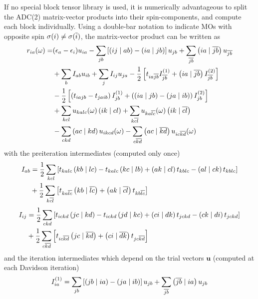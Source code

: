 If no special block tensor library is used, it is numerically advantageous to split the ADC(2) matrix-vector products into their spin-components, and compute each block individually. Using a double-bar notation to indicate MOs with opposite spin $\sigma(i) \neq \sigma(\overline{i})$, the matrix-vector product can be written as
\begin{equation}
\begin{split}
r_{ia}( \omega) = &(\epsilon_a - \epsilon_i) u_{ia} - \sum_{jb} \left[ \left( ij \mid ab \right) - \left( ia \mid jb \right) \right] u_{jb} + \sum_{\overline{jb}} \left( ia \mid \overline{jb} \right) u_{\overline{jb}} \\
&+ \sum_b I_{ab} u_{ib} + \sum_{j} I_{ij} u_{ja} - \frac{1}{2} \left[ t_{ia\overline{jb}} I^{(1)}_{\overline{jb}} + \left( ia \mid \overline{jb} \right) I_{\overline{jb}}^{(2)} \right] \\
&- \frac{1}{2} \left[ \left( t_{iajb} - t_{jaib} \right) I^{(1)}_{jb} + \left(\left( ia \mid jb \right) - \left( ja \mid ib \right) \right) I_{jb}^{(2)} \right] \\
&+ \sum_{kcl} u_{kalc}(\omega) \left( ik \mid cl \right) + \sum_{k\overline{cl}} u_{ka\overline{lc}}(\omega) \left( ik \mid \overline{cl} \right) \\
&- \sum_{ckd} \left( ac \mid kd \right) u_{ikcd}(\omega) - \sum_{c\overline{kd}} \left( ac \mid \overline{kd} \right) u_{ic\overline{kd}}(\omega)
\end{split}
\end{equation}  
\noindent with the preiteration intermediates (computed only once)
\begin{equation}
\begin{split}
I_{ab} &= \frac{1}{2} \sum_{kcl} \left[ t_{kalc} \left( kb \mid lc \right) - t_{kalc} \left( kc \mid lb \right) + \left( ak \mid cl \right) t_{kblc} - \left( al \mid ck \right) t_{kblc} \right] \\
&+ \frac{1}{2} \sum_{k\overline{cl}} \left[ t_{ka\overline{lc}} \left( kb \mid \overline{lc} \right) + \left( ak \mid \overline{cl} \right) t_{kb\overline{lc}} \right] 
\end{split}
\end{equation}
\begin{equation}
\begin{split}
I_{ij} &= \frac{1}{2} \sum_{ckd} \left[ t_{ickd} \left( jc \mid kd \right) - t_{ickd} \left( jd \mid kc \right) + \left( ci \mid dk \right) t_{jckd} - \left( ck \mid di \right) t_{jckd} \right] \\
&+ \frac{1}{2} \sum_{c\overline{kd}} \left[ t_{ic\overline{kd}} \left( jc \mid \overline{kd} \right) + \left( ci \mid \overline{dk} \right) t_{jc\overline{kd}} \right]  
\end{split}
\end{equation}
\noindent and the iteration intermediates which depend on the trial vectors $\mathbf{u}$ (computed at each Davidson iteration)
\begin{equation}
I_{ia}^{(1)} = \sum_{jb} \left[ \left( jb \mid ia \right) - \left( ja \mid ib \right) \right] u_{jb} + \sum_{\overline{jb}} \left( \overline{jb} \mid ia \right) u_{jb}
\end{equation}
